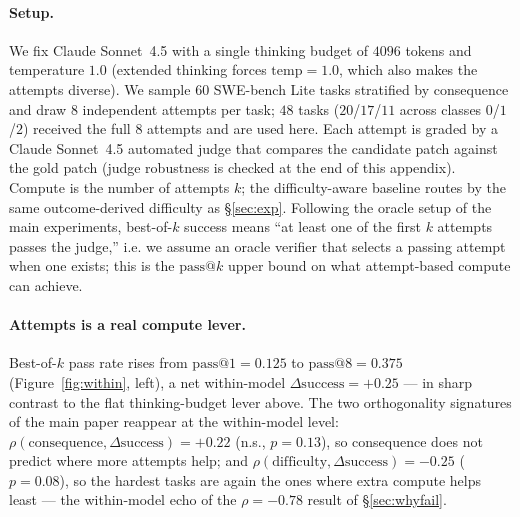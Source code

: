 \documentclass{article}
\begin{document}
\paragraph{Setup.} We fix Claude Sonnet~4.5 with a single thinking
budget of $4096$ tokens and temperature $1.0$ (extended thinking
forces $\mathrm{temp}{=}1.0$, which also makes the attempts diverse).
We sample $60$ SWE-bench Lite tasks stratified by consequence and draw
$8$ independent attempts per task; $48$ tasks ($20$/$17$/$11$ across
classes $0$/$1$/$2$) received the full $8$ attempts and are used
here. Each attempt is graded by a Claude Sonnet~4.5 automated judge
that compares the candidate patch against the gold patch (judge
robustness is checked at the end of this appendix).
Compute is the number of attempts $k$; the difficulty-aware baseline
routes by the same outcome-derived difficulty as \S\ref{sec:exp}.
Following the oracle setup
of the main experiments, best-of-$k$ success means ``at least one of
the first $k$ attempts passes the judge,'' i.e. we assume an oracle
verifier that selects a passing attempt when one exists; this is the
$\mathrm{pass@}k$ upper bound on what attempt-based compute can
achieve.

\paragraph{Attempts is a real compute lever.} Best-of-$k$ pass rate
rises from $\mathrm{pass@}1 = 0.125$ to $\mathrm{pass@}8 = 0.375$
(Figure~\ref{fig:within}, left), a net within-model
$\Delta\mathrm{success} = +0.25$ --- in sharp contrast to
the flat thinking-budget lever above. The two orthogonality
signatures of the main paper reappear at the within-model level:
$\rho(\mathrm{consequence}, \Delta\mathrm{success}) = +0.22$ (n.s.,
$p = 0.13$), so consequence does not predict where more attempts
help; and $\rho(\mathrm{difficulty}, \Delta\mathrm{success}) = -0.25$
($p = 0.08$), so the hardest tasks are again the ones where extra
compute helps least --- the within-model echo of the
$\rho = -0.78$ result of \S\ref{sec:whyfail}.
\end{document}
